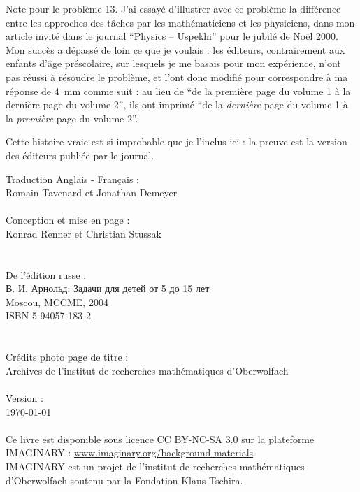 \vfill
\begin{note}{Note pour le problème 13.}
    J’ai essayé d’illustrer avec ce problème la différence entre les approches des tâches par les mathématiciens et les physiciens, dans mon article invité dans le journal \enquote{Physics -- Uspekhi} pour le jubilé de Noël 2000. Mon succès a dépassé de loin ce que je voulais : les éditeurs, contrairement aux enfants d’âge préscolaire, sur lesquels je me basais pour mon expérience, n’ont pas réussi à résoudre le problème, et l’ont donc modifié pour correspondre à ma réponse de \SI{4}{\mm} comme suit : au lieu de \enquote{de la première page du volume 1 à la dernière page du volume 2}, ils ont imprimé \enquote{de la \emph{dernière} page du volume 1 à la \emph{première} page du volume 2}.

    Cette histoire vraie est si improbable que je l’inclus ici : la preuve est la version des éditeurs publiée par le journal.
\end{note}
\clearpage
\null\vfill
\noindent
Traduction Anglais - Français :\\
\null\quad Romain Tavenard et Jonathan Demeyer\\
\\
Conception et mise en page :\\
\null\quad Konrad Renner et Christian Stussak\\
\\
\\
De l'édition russe :\\
\null\quad \textrussian{В. И. Арнольд: Задачи для детей от 5 до 15 лет}\\
\null\quad Moscou, MCCME, 2004\\
\null\quad ISBN 5-94057-183-2\\
\\
\\
Crédits photo page de titre :\\
\null\quad Archives de l’institut de recherches mathématiques d'Oberwolfach\\
\\
Version :\\
\null\quad \today\\
\\
Ce livre est disponible sous licence CC BY-NC-SA 3.0 sur la plateforme IMAG\-I\-NARY : \href{http://www.imaginary.org/background-materials}{www.imaginary.org/background-materials}.\\
IMAGINARY est un projet de l’institut de recherches mathématiques d'Oberwolfach soutenu par la Fondation Klaus-Tschira.
